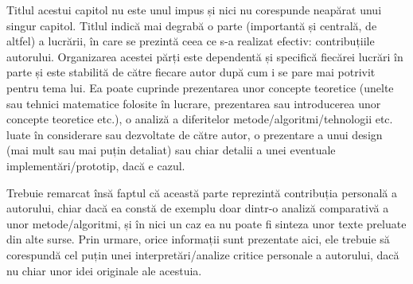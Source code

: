 Titlul acestui capitol nu este unul impus și nici nu corespunde neapărat unui singur capitol. Titlul indică mai degrabă o parte (importantă și centrală, de altfel) a lucrării, în care se prezintă ceea ce s-a realizat efectiv: contribuțiile autorului. Organizarea acestei părți este dependentă și specifică fiecărei lucrări în parte și este stabilită de către fiecare autor după cum i se pare mai potrivit pentru tema lui. Ea poate cuprinde prezentarea unor concepte teoretice (unelte sau tehnici matematice folosite în lucrare, prezentarea sau introducerea unor concepte teoretice etc.), o analiză a diferitelor metode/algoritmi/tehnologii etc. luate în considerare sau dezvoltate de către autor, o prezentare a unui design (mai mult sau mai puțin detaliat) sau chiar detalii a unei eventuale implementări/prototip, dacă e cazul.

Trebuie remarcat însă faptul că această parte reprezintă contribuția personală a autorului, chiar dacă ea constă de exemplu doar dintr-o analiză comparativă a unor metode/algoritmi, și în nici un caz ea nu poate fi sinteza unor texte preluate din alte surse. Prin urmare, orice informații sunt prezentate aici, ele trebuie să corespundă cel puțin unei interpretări/analize critice personale a autorului, dacă nu chiar unor idei originale ale acestuia. 
